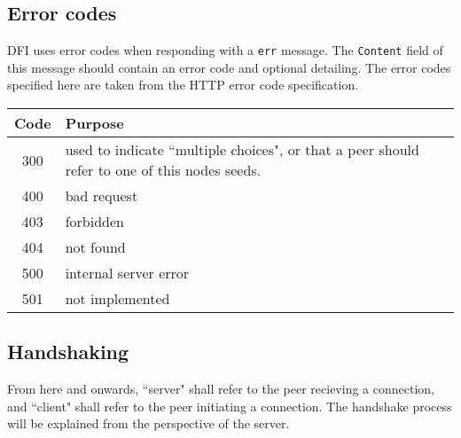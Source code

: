 \begin{center}
\begin{tabular}{ c|p{8cm} }
	\end{tabular}
	\end{center}

	\subsection{Error codes}
	DFI uses error codes when responding with a \texttt{err} message. The
	\texttt{Content} field of this message should contain an error code and optional
	detailing. The error codes specified here are taken from the HTTP error code
	specification.

	\begin{center}
		\begin{tabular}{ c|p{8cm} }
			\textbf{Code} & \textbf{Purpose} \\
			\hline
			300           & used to indicate ``multiple choices", or that a peer
			                should refer to one of this nodes seeds. \\
			\hline
			400           & bad request \\
			\hline
			403           & forbidden \\
			\hline
			404           & not found \\
			\hline
			500           & internal server error \\
			\hline
		    501           & not implemented \\
			\hline
		\end{tabular}
	\end{center}

	\subsection{Handshaking}
	From here and onwards, ``server" shall refer to the peer recieving a
	connection, and ``client" shall refer to the peer initiating a connection.
	The handshake process will be explained from the perspective of the server.
	
